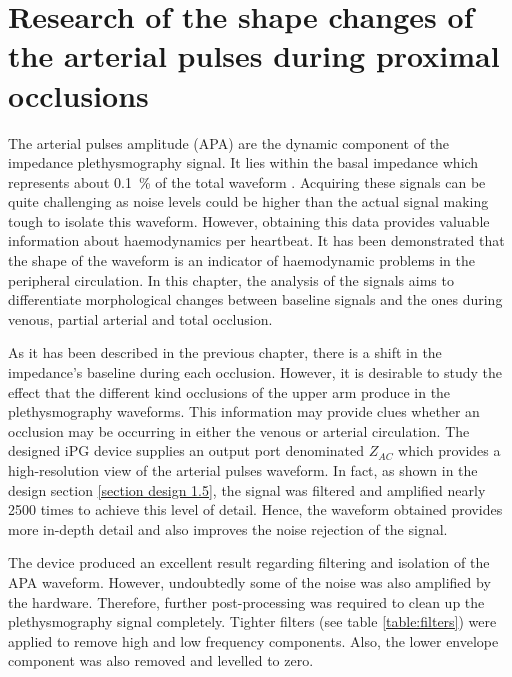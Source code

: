 
\chapter{Research of the shape changes of the arterial pulses during proximal occlusions}  %
\label{chapter apa}

\ifpdf
\graphicspath{{Chapter8/Figs/Raster/}{Chapter8/Figs/PDF/}{Chapter8/Figs/}}
\else
\graphicspath{{Chapter8/Figs/Vector/}{Chapter8/Figs/}}
\fi

The arterial pulses amplitude (APA) are the dynamic component of the impedance plethysmography signal. It lies within the basal impedance which represents about \SI{0.1}{\percent} of the total waveform \cite{anderson1984impedance}. Acquiring these signals can be quite challenging as noise levels could be higher than the actual signal making tough to isolate this waveform. However, obtaining this data provides valuable information about haemodynamics per heartbeat. It has been demonstrated that the shape of the waveform is an indicator of haemodynamic problems in the peripheral circulation. In this chapter, the analysis of the signals aims to differentiate morphological changes between baseline signals and the ones during venous, partial arterial and total occlusion.

As it has been described in the previous chapter, there is a shift in the impedance's baseline during each occlusion. However, it is desirable to study the effect that the different kind occlusions of the upper arm produce in the plethysmography waveforms.  This information may provide clues whether an occlusion may be occurring in either the venous or arterial circulation.  The designed iPG device supplies an output port denominated $Z_{AC}$  which provides a high-resolution view of the arterial pulses waveform.  In fact, as shown in the design section \ref{section design 1.5}, the signal was filtered and amplified nearly 2500 times to achieve this level of detail. Hence, the waveform obtained provides more in-depth detail and also improves the noise rejection of the signal.

The device produced an excellent result regarding filtering and isolation of the APA waveform. However, undoubtedly some of the noise was also amplified by the hardware. Therefore, further post-processing was required to clean up the plethysmography signal completely. Tighter filters (see table \ref{table:filters}) were applied to remove high and low frequency components. Also, the lower envelope component was also removed and levelled to zero.

